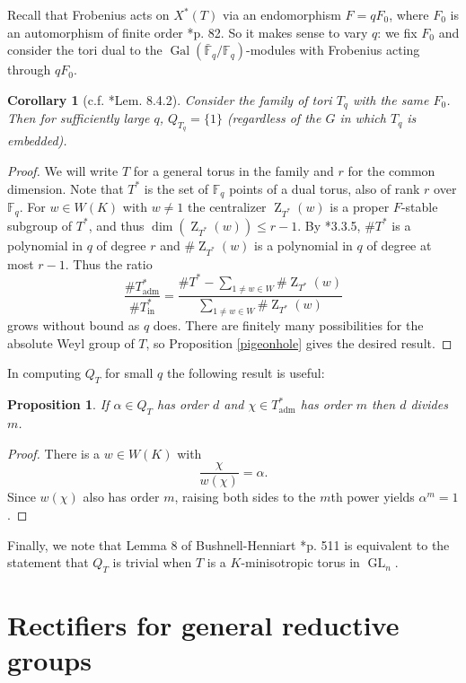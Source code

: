 \documentclass{amsart}
\theoremstyle{plain}
\newtheorem{proposition}[theorem]{Proposition}
\newtheorem{corollary}[theorem]{Corollary}
\theoremstyle{definition}
\numberwithin{equation}{section}
\DeclareMathOperator{\Gal}{Gal}
\DeclareMathOperator{\Z}{Z}
\DeclareMathOperator{\GL}{GL}
\newcommand{\Fq}{\mathbb{F}_q}
\newcommand{\Fqb}{\bar{\mathbb{F}}_q}
\newcommand{\Thadm}{T^*_{\operatorname{adm}}}
\newcommand{\Thinadm}{T^*_{\operatorname{in}}}
\newcommand{\hatT}{T^*}
\begin{document}
Recall that Frobenius acts on $X^*(T)$ via an endomorphism $F = qF_0$, where
$F_0$ is an automorphism of finite order \cite{carter:93a}*{p. 82}.  So it makes sense
to vary $q$: we fix $F_0$ and consider the tori dual to the $\Gal(\Fqb/\Fq)$-modules
with Frobenius acting through $qF_0$.

\begin{corollary}[{c.f. \cite{carter:93a}*{Lem. 8.4.2}}]
Consider the family of tori $T_q$ with the same $F_0$.  Then for sufficiently large $q$,
$Q_{T_q} = \{ 1 \}$ (regardless of the $G$ in which $T_q$ is embedded).
\end{corollary}
\begin{proof}
We will write $T$ for a general torus in the family and $r$ for the common dimension.
Note that $\hatT$ is the set of $\Fq$ points of a dual torus, also of rank $r$ over $\Fq$.
For $w \in W(K)$ with $w \ne 1$ the centralizer $\Z_{\hatT}(w)$ is a proper $F$-stable
subgroup of $\hatT$, and thus $\dim(\Z_{\hatT}(w)) \le r - 1$.  By \cite{carter:93a}*{3.3.5},
$\# \hatT$ is a polynomial in $q$ of degree $r$ and $\# \Z_{\hatT}(w)$ is a polynomial
in $q$ of degree at most $r-1$.  Thus the ratio
$$\frac{\# \Thadm}{\# \Thinadm} = \frac{\# \hatT - \sum_{1 \ne w \in W} \# \Z_{\hatT}(w)}{\sum_{1 \ne w \in W} \# \Z_{\hatT}(w)}$$
grows without bound as $q$ does.  There are finitely many possibilities for the absolute
Weyl group of $T$, so Proposition \ref{pigeonhole} gives the desired result.
\end{proof}

In computing $Q_T$ for small $q$ the following result is useful:

\begin{proposition} \label{orderdiv}
If $\alpha \in Q_T$ has order $d$ and $\chi \in \Thadm$ has order $m$ then $d$ divides $m$.
\end{proposition}
\begin{proof}
There is a $w \in W(K)$ with
$$\frac{\chi}{w(\chi)} = \alpha.$$
Since $w(\chi)$ also has order $m$, raising both sides to the $m$th power  yields $\alpha^m = 1$.
\end{proof}

Finally, we note that Lemma 8 of Bushnell-Henniart \cite{bushnell-henniart:10a}*{p. 511} is equivalent to
the statement that $Q_T$ is trivial when $T$ is a $K$-minisotropic torus in $\GL_n$.

\section{Rectifiers for general reductive groups} \label{section:general_rectifiers}
\end{document}
